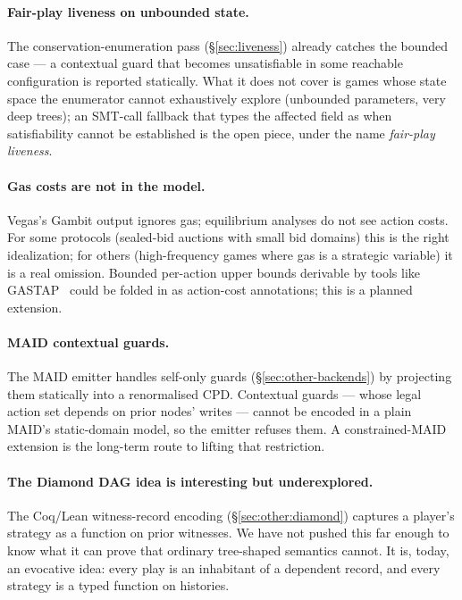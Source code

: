 \paragraph{Fair-play liveness on unbounded state.}  The
conservation-enumeration pass (\S\ref{sec:liveness}) already
catches the bounded case --- a contextual guard that becomes
unsatisfiable in some reachable configuration is reported
statically.  What it does not cover is games whose state space
the enumerator cannot exhaustively explore (unbounded 
parameters, very deep trees); an SMT-call fallback that types
the affected field as  when satisfiability cannot be
established is the open piece, under the name \emph{fair-play
liveness}.

\paragraph{Gas costs are not in the model.}  Vegas's Gambit
output ignores gas; equilibrium analyses do not see action
costs.  For some protocols (sealed-bid auctions with small bid
domains) this is the right idealization; for others (high-frequency
games where gas is a strategic variable) it is a real omission.
Bounded per-action upper bounds derivable by tools like
GASTAP~\citep{Albert2020Gastap} could be folded in as
action-cost annotations; this is a planned extension.

\paragraph{MAID contextual guards.}  The MAID emitter handles
self-only guards (\S\ref{sec:other-backends}) by projecting them
statically into a renormalised CPD.  Contextual guards --- whose
legal action set depends on prior nodes' writes --- cannot be
encoded in a plain MAID's static-domain model, so the emitter
refuses them.  A constrained-MAID extension is the long-term
route to lifting that restriction.

\paragraph{The Diamond DAG idea is interesting but
underexplored.}  The Coq/Lean witness-record encoding
(\S\ref{sec:other:diamond}) captures a player's strategy as a
function on prior witnesses.  We have not pushed this far enough
to know what it can prove that ordinary tree-shaped semantics
cannot.  It is, today, an evocative idea: every play is an
inhabitant of a dependent record, and every strategy is a typed
function on histories.

